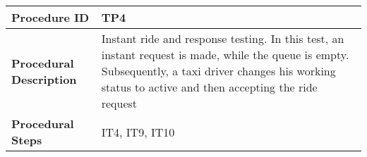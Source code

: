 \noindent\begin{tabular}{l p{}}
    \hline
    \textbf{Procedure ID} & \textbf{TP4}\\
    \hline
    \textbf{Procedural Description} & Instant ride and response testing. In this test, an instant request is made, while the queue is empty. Subsequently, a taxi driver changes his
		working status to active and then accepting the ride request\\
    \hline
    \textbf{Procedural Steps} & IT4, IT9, IT10\\
\end{tabular}